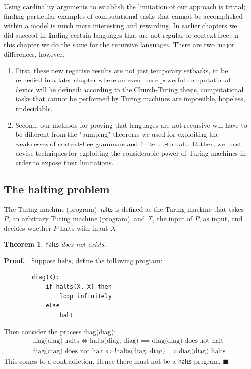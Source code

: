 \documentclass[aps,pra,onecolumn,notitlepage,superscriptaddress]{revtex4-1}
\newtheorem{theo}{Theorem}
\def\Proof{{\bf Proof.~}}
\def\qed{$\blacksquare$ \newline}
\begin{document}
    Using cardinality arguments to establish the limitation of our approach is trivial; finding particular examples of computational tasks that cannot be accomplished within a model is much more interesting and rewarding. In earlier chapters we did succeed in finding certain languages that are not regular or context-free; in this chapter we do the same for the recursive languages. There are two major differences, however. 
    \begin{enumerate}
        \item First, these new negative results are not just temporary setbacks, to be remedied in a later chapter where an even more powerful computational device will be defined: according to the Church-Turing thesis, computational tasks that cannot be performed by Turing machines are impossible, hopeless, undecidable. 
        \item Second, our methods for proving that languages are not recursive will have to be different from the "pumping" theorems we used for exploiting the weaknesses of context-free grammars and finite au-tomata. Rather, we must devise techniques for exploiting the considerable power of Turing machines in order to expose their limitations.
    \end{enumerate}

    \subsection{The halting problem}

    The Turing machine (program) $\mathsf{halts}$ is defined as the Turing machine that takes $P$, an arbitrary Turing machine (program), and $X$, the input of $P$, as input, and decides whether $P$ halts with input $X$.

    \begin{theo}
        $\mathsf{halts}$ does not exists.
    \end{theo}
    \Proof
    Suppose $\mathsf{halts}$, define the following program:
    \begin{lstlisting}
        diag(X):
            if halts(X, X) then
                loop infinitely
            else
                halt
    \end{lstlisting}

    Then consider the process diag(diag):
    \begin{align*}
        &\text{diag(diag) halts} \Longleftrightarrow \text{halts(diag, diag)} \implies  \text{diag(diag) does not halt} \\
        &\text{diag(diag) does not halt} \Longleftrightarrow \text{!halts(diag, diag)} \implies \text{diag(diag) halts}
    \end{align*}
    This comes to a contradiction. Hence there must not be a $\mathsf{halts}$ program. \qed
\end{document}
